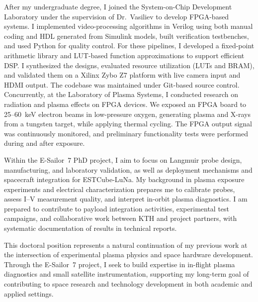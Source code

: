 \documentclass[a4paper,12pt]{article}
\begin{document}
After my undergraduate degree, I joined the System-on-Chip Development Laboratory under the supervision of Dr.\ Vasiliev to develop FPGA-based systems. I implemented video-processing algorithms in Verilog using both manual coding and HDL generated from Simulink models, built verification testbenches, and used Python for quality control. For these pipelines, I developed a fixed-point arithmetic library and LUT-based function approximations to support efficient DSP. I synthesized the designs, evaluated resource utilization (LUTs and BRAM), and validated them on a Xilinx Zybo Z7 platform with live camera input and HDMI output. The codebase was maintained under Git-based source control. Concurrently, at the Laboratory of Plasma Systems, I conducted research on radiation and plasma effects on FPGA devices. We exposed an FPGA board to 25--60~keV electron beams in low-pressure oxygen, generating plasma and X-rays from a tungsten target, while applying thermal cycling. The FPGA output signal was continuously monitored, and preliminary functionality tests were performed during and after exposure.

Within the E-Sailor~7 PhD project, I aim to focus on Langmuir probe design, manufacturing, and laboratory validation, as well as deployment mechanisms and spacecraft integration for ESTCube-LuNa. My background in plasma exposure experiments and electrical characterization prepares me to calibrate probes, assess I--V measurement quality, and interpret in-orbit plasma diagnostics. I am prepared to contribute to payload integration activities, experimental test campaigns, and collaborative work between KTH and project partners, with systematic documentation of results in technical reports.

This doctoral position represents a natural continuation of my previous work at the intersection of experimental plasma physics and space hardware development. Through the E-Sailor~7 project, I seek to build expertise in in-flight plasma diagnostics and small satellite instrumentation, supporting my long-term goal of contributing to space research and technology development in both academic and applied settings.
\end{document}
